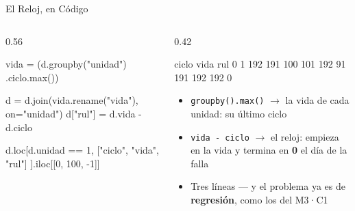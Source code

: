 \documentclass[aspectratio=169, 11pt]{beamer}
\begin{document}
\begin{frame}[fragile, shrink=22]{El Reloj, en Código}
  \vspace{-4pt}
  \begin{columns}[T]
    \begin{column}{0.56\textwidth}
      \begin{pyblock}
vida = (d.groupby("unidad")
         .ciclo.max())

d = d.join(vida.rename("vida"),
           on="unidad")
d["rul"] = d.vida - d.ciclo

d.loc[d.unidad == 1,
      ["ciclo", "vida", "rul"]
     ].iloc[[0, 100, -1]]
      \end{pyblock}
    \end{column}
    \begin{column}{0.42\textwidth}
      \vspace{2pt}
      \begin{outputblock}
     ciclo  vida  rul
0        1   192  191
100    101   192   91
191    192   192    0
      \end{outputblock}
      \vspace{6pt}
      {\footnotesize\color{textMuted}
      \begin{itemize}\setlength{\itemsep}{5pt}
        \item[{\color{arcaRed}\scriptsize\faArrowRight}]
          \texttt{groupby().max()} $\rightarrow$ la vida de cada unidad:
          su último ciclo
        \item[{\color{arcaRed}\scriptsize\faArrowRight}]
          \texttt{vida - ciclo} $\rightarrow$ el reloj: empieza en la vida
          y termina en \textbf{0} el día de la falla
        \item[{\color{arcaRed}\scriptsize\faArrowRight}]
          Tres líneas --- y el problema ya es de \textbf{regresión}, como
          los del M3·C1
      \end{itemize}}
    \end{column}
  \end{columns}
\end{frame}
\end{document}
